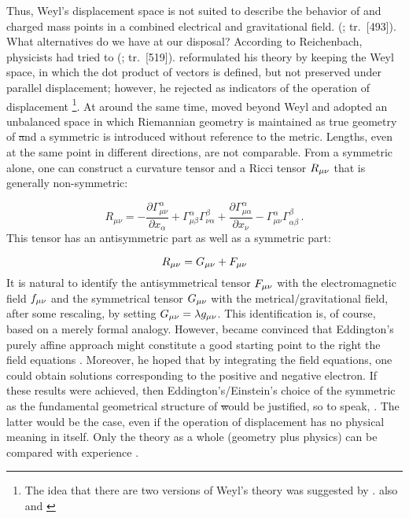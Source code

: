 \documentclass[final]{article}
\newcommand{\faradaymn}{\ensuremath{f\mn}}
\renewcommand{\rzlap}[2]{(\cite[#1]{Reichenbach1928}; tr.\ [#2])\xspace}
\begin{document}
Thus, Weyl's displacement space is not suited to describe the behavior of \rac and charged mass points in a combined electrical and gravitational field.  \rzlap{353}{493}. What alternatives do we have at our disposal? According to Reichenbach, physicists had tried to  \rzlap{371}{519}. \citet{Weyl1921} reformulated his theory by keeping the  Weyl space, in which the dot product of vectors is defined, but not preserved under parallel displacement; however, he rejected \rac as indicators of the operation of displacement \Gtmn\footnote{The idea that there are two versions of Weyl's theory was suggested by \cite{Pauli1921a}. \Cf also \citep{Weyl1921e} and \citep[367--368]{Reichenbach1921}}. At around the same time, \citet{Eddington1921} moved beyond Weyl and adopted an unbalanced space in which Riemannian geometry is maintained as true geometry of \st and a symmetric \Gtmn is introduced without reference to the metric. Lengths, even at the same point in different directions, are not comparable. From a symmetric \Gtmn alone, one can construct a curvature tensor \ritea and a Ricci tensor $R_{\mu\nu}$ that is generally non-symmetric:

\begin{equation*}
R_{\mu \nu}=-\frac{\partial \Gamma_{\mu \nu}^{\alpha}}{\partial x_{\alpha}}+\Gamma_{\mu \beta}^{\alpha} \Gamma_{\nu \alpha}^{\beta}+\frac{\partial \Gamma_{\mu \alpha}^{\alpha}}{\partial x_{\nu}}-\Gamma_{\mu \nu}^{\alpha} \Gamma_{\alpha \beta}^{\beta}\,.
\end{equation*}
%
This tensor has an antisymmetric part as well as a symmetric part:

\begin{equation*}
R_{\mu\nu}=G_{\mu\nu}+ F_{\mu\nu}
\end{equation*}
%
It is natural to identify the antisymmetrical tensor $F_{\mu\nu}$ with the electromagnetic field $\faradaymn$ and the symmetrical tensor $G_{\mu\nu}$ with the metrical/gravitational field, after some rescaling, by setting $G_{\mu\nu}=\lambda g_{\mu\nu}$. This identification is, of course, based on a merely formal analogy. However, \citet{Einstein1923c,Einstein1923d,Einstein1925d} became convinced that Eddington's purely affine approach might constitute a good starting point to  the right the field equations . Moreover, he hoped that by integrating the field equations, one could obtain solutions corresponding to the positive and negative electron. If these results were achieved, then Eddington's/Einstein's choice of the symmetric \Gtmn as the fundamental geometrical structure of \st would be justified, so to speak, . The latter would be the case, even if the operation of displacement has no physical meaning in itself. Only the theory as a whole (geometry plus physics) can be compared with experience \citep{Einstein1921b,Einstein1924,Einstein1926}.
\end{document}
